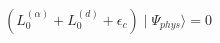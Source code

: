 \begin{equation}
(L_{0}^{(\alpha)}+L_{0}^{(d)}+\epsilon_{c})\mid\Psi_{phys}\rangle=0
\end{equation}

